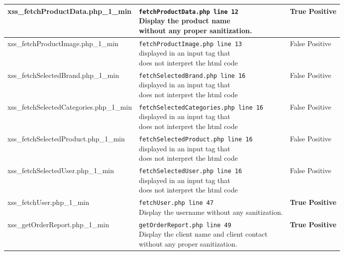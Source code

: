 \documentclass[11pt]{article}
\begin{document}
\begin{longtable}[H]{| p{} | p{} | p{} |}
	 	\hline
	  	xss\_fetchProductData.php\_1\_min 	
	  	& \makecell{ \texttt{fetchProductData.php line 12} \\
					Display the product name \\
				  without any proper sanitization.}    
	 	& \textbf{True Positive}\\

	 	\hline
	  	xss\_fetchProductImage.php\_1\_min 	
	  	& \makecell{ \texttt{fetchProductImage.php line 13} \\
				 displayed in an input tag that \\
					does not interpret the html code}  
	 	& False Positive \\

	 	\hline
	  	xss\_fetchSelectedBrand.php\_1\_min 	
	  	& \makecell{ \texttt{fetchSelectedBrand.php line 16} \\
				 displayed in an input tag that \\
					does not interpret the html code} 
	 	& False Positive \\

	 	\hline
	  	xss\_fetchSelectedCategories.php\_1\_min 	
	  	& \makecell{ \texttt{fetchSelectedCategories.php line 16} \\
				 displayed in an input tag that \\
					does not interpret the html code}
	 	& False Positive \\

	 	\hline
	  	xss\_fetchSelectedProduct.php\_1\_min 	
	  	& \makecell{ \texttt{fetchSelectedProduct.php line 16} \\
				 displayed in an input tag that \\
					does not interpret the html code}
	 	& False Positive \\

	 	\hline
	  	xss\_fetchSelectedUser.php\_1\_min 	
	  	& \makecell{ \texttt{fetchSelectedUser.php line 16} \\
				 displayed in an input tag that \\
					does not interpret the html code}
	 	& False Positive \\

	 	\hline
	  	xss\_fetchUser.php\_1\_min
	  	& \makecell{ \texttt{fetchUser.php line 47} \\
				 Display the username without any sanitization.}  
	 	& \textbf{True Positive}\\

	 	\hline
	  	xss\_getOrderReport.php\_1\_min 	
	  	& \makecell{ \texttt{getOrderReport.php line 49} \\
				 Display the client name and client contact \\
				 without any proper sanitization.}  
	 	& \textbf{True Positive}\\


\end{longtable}
\end{document}
